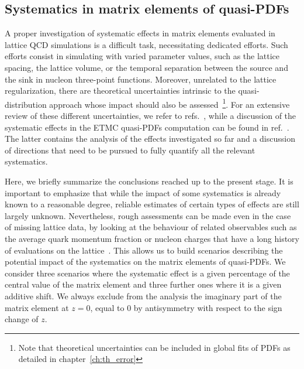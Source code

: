 \subsection{Systematics in matrix elements of quasi-PDFs}
\label{subsec:sys}

A proper investigation of systematic effects in matrix elements evaluated in
lattice QCD simulations is a difficult task, necessitating dedicated efforts.
Such efforts consist in simulating with varied parameter values, such as the
lattice spacing, the lattice volume, or the temporal separation between the
source and the sink in nucleon three-point functions. Moreover, unrelated to the
lattice regularization, there are theoretical uncertainties intrinsic to the
quasi-distribution approach whose impact should also be assessed~\footnote{Note
that theoretical uncertainties can be included in global fits of PDFs as
detailed in chapter~\ref{ch:th_error}}. For an extensive review of these
different uncertainties, we refer to refs.~\cite{Cichy:2018mum,Monahan:2018euv},
while a discussion of the systematic effects in the ETMC quasi-PDFs computation
can be found in ref.~\cite{Alexandrou:2019lfo}. The latter contains the analysis
of the effects investigated so far and a discussion of directions that need to
be pursued to fully quantify all the relevant systematics.

Here, we briefly summarize the conclusions reached up to the present stage. It
is important to emphasize that while the impact of some systematics is already
known to a reasonable degree, reliable estimates of certain types of effects are
still largely unknown. Nevertheless, rough assessments can be made even in the
case of missing lattice data, by looking at the behaviour of related observables
such as the average quark momentum fraction or nucleon charges that have a long
history of evaluations on the
lattice~\cite{Syritsyn:2014saa,Constantinou:2014tga,Constantinou:2015agp,Alexandrou:2015xts,Green:2018vxw}.
This allows us to build scenarios describing the potential impact of the
systematics on the matrix elements of quasi-PDFs. We consider three scenarios
where the systematic effect is a given percentage of the central value of the
matrix element and three further ones where it is a given additive shift. We
always exclude from the analysis the imaginary part of the matrix element at
$z=0$, equal to 0 by antisymmetry with respect to the sign change of $z$.


